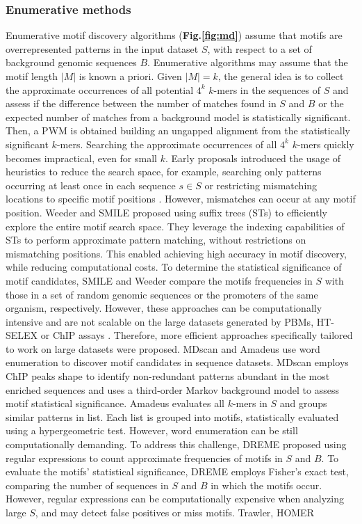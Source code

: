 \documentclass[a4paper, titlepage, openright]{book}
\begin{document}
\subsubsection{Enumerative methods}
Enumerative motif discovery algorithms (\textbf{Fig.\ref{fig:md}}) assume that motifs are overrepresented patterns in the input dataset $S$, with respect to a set of background genomic sequences $B$. Enumerative algorithms may assume that the motif length $|M|$ is known a priori. Given $|M| = k$, the general idea is to collect the approximate occurrences of all potential $4^{k}$ $k$-mers in the sequences of $S$ and assess if the difference between the number of matches found in $S$ and $B$ or the expected number of matches from a background model is statistically significant. Then, a PWM is obtained building an ungapped alignment from the statistically significant $k$-mers. Searching the approximate occurrences of all $4^{k}$ $k$-mers quickly becomes impractical, even for small $k$. Early proposals introduced the usage of heuristics to reduce the search space, for example, searching only patterns occurring at least once in each sequence $s \in S$ \citep{li1999finding} or restricting mismatching locations to specific motif positions \citep{califano2000splash}. However, mismatches can occur at any motif position. Weeder \citep{pavesi2001algorithm, pavesi2004weeder} and SMILE \citep{marsan2000algorithms} proposed using suffix trees (STs) \citep{weiner1973linear} to efficiently explore the entire motif search space. They leverage the indexing capabilities of STs to perform approximate pattern matching, without restrictions on mismatching positions. This enabled achieving high accuracy in motif discovery, while reducing computational costs. To determine the statistical significance of motif candidates, SMILE and Weeder compare the motifs frequencies in $S$ with those in a set of random genomic sequences or the promoters of the same organism, respectively. However, these approaches can be computationally intensive and are not scalable on the large datasets generated by PBMs, HT-SELEX or ChIP assays \citep{liu2018algorithmic}. Therefore, more efficient approaches specifically tailored to work on large datasets were proposed. MDscan \citep{liu2002algorithm} and Amadeus \citep{linhart2008transcription} use word enumeration to discover motif candidates in sequence datasets. MDscan employs ChIP peaks shape to identify non-redundant patterns abundant in the most enriched sequences and uses a third-order Markov background model to assess motif statistical significance. Amadeus evaluates all $k$-mers in $S$ and groups similar patterns in list. Each list is grouped into motifs, statistically evaluated using a hypergeometric test. However, word enumeration can be still computationally demanding. To address this challenge, DREME  \citep{bailey2011dreme} proposed using regular expressions to count approximate frequencies of motifs in $S$ and $B$. To evaluate the motifs’ statistical significance, DREME employs Fisher’s exact test, comparing the number of sequences in $S$ and $B$ in which the motifs occur. However, regular expressions can be computationally expensive when analyzing large $S$, and may detect false positives or miss motifs. Trawler, HOMER 
\end{document}
